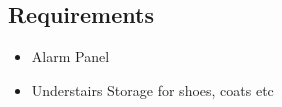 \subsection{Requirements}
\begin{itemize}
\item Alarm Panel
\item Understairs Storage for shoes, coats etc
    
\end{itemize}
